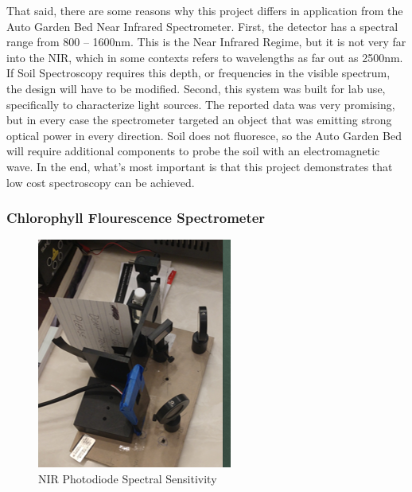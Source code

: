 That said, there are some reasons why this project differs in application from the Auto Garden Bed Near Infrared Spectrometer. First, the detector has a spectral range from 800 – 1600nm. This is the Near Infrared Regime, but it is not very far into the NIR, which in some contexts refers to wavelengths as far out as 2500nm. If Soil Spectroscopy requires this depth, or frequencies in the visible spectrum, the design will have to be modified. Second, this system was built for lab use, specifically to characterize light sources. The reported data was very promising, but in every case the spectrometer targeted an object that was emitting strong optical power in every direction. Soil does not fluoresce, so the Auto Garden Bed will require additional components to probe the soil with an electromagnetic wave. In the end, what’s most important is that this project demonstrates that low cost spectroscopy can be achieved.


\subsubsection{Chlorophyll Flourescence Spectrometer}

\begin{figure}[H]
    \caption{NIR Photodiode Spectral Sensitivity}
    \centering
    \includegraphics[width=\textwidth]{images/3.1.2Pic.png}
\end{figure}

